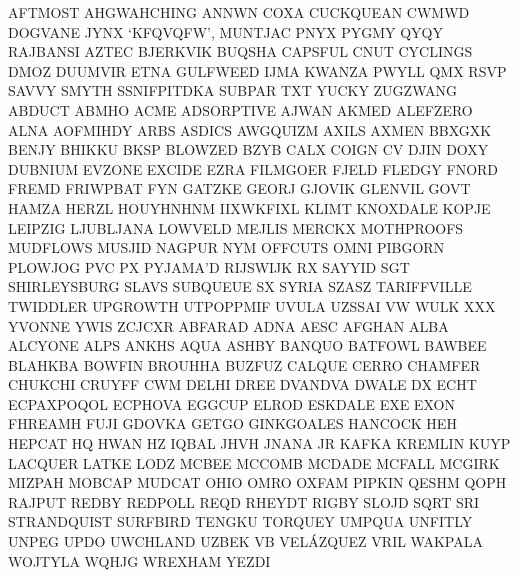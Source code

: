 \documentclass[a4paper,14pt]{memoir}
\begin{document}
{AFTMOST AHGWAHCHING ANNWN COXA CUCKQUEAN CWMWD DOGVANE JYNX ‘KFQVQFW’, MUNTJAC PNYX PYGMY QYQY RAJBANSI AZTEC BJERKVIK BUQSHA CAPSFUL CNUT CYCLINGS DMOZ DUUMVIR ETNA GULFWEED IJMA KWANZA PWYLL QMX RSVP SAVVY SMYTH SSNIFPITDKA SUBPAR TXT YUCKY ZUGZWANG ABDUCT ABMHO ACME ADSORPTIVE AJWAN AKMED ALEFZERO ALNA AOFMIHDY ARBS ASDICS AWGQUIZM AXILS AXMEN BBXGXK BENJY BHIKKU BKSP BLOWZED BZYB CALX COIGN CV DJIN DOXY DUBNIUM EVZONE EXCIDE EZRA FILMGOER FJELD FLEDGY FNORD FREMD FRIWPBAT FYN GATZKE GEORJ GJOVIK GLENVIL GOVT HAMZA HERZL HOUYHNHNM IIXWKFIXL KLIMT KNOXDALE KOPJE LEIPZIG LJUBLJANA LOWVELD MEJLIS MERCKX MOTHPROOFS MUDFLOWS MUSJID NAGPUR NYM OFFCUTS OMNI PIBGORN PLOWJOG PVC PX PYJAMA’D RIJSWIJK RX SAYYID SGT SHIRLEYSBURG SLAVS SUBQUEUE SX SYRIA SZASZ TARIFFVILLE TWIDDLER UPGROWTH UTPOPPMIF UVULA UZSSAI VW WULK XXX YVONNE YWIS ZCJCXR ABFARAD ADNA AESC AFGHAN ALBA ALCYONE ALPS ANKHS AQUA ASHBY BANQUO BATFOWL BAWBEE BLAHKBA BOWFIN BROUHHA BUZFUZ CALQUE CERRO CHAMFER CHUKCHI CRUYFF CWM DELHI DREE DVANDVA DWALE DX ECHT ECPAXPOQOL ECPHOVA EGGCUP ELROD ESKDALE EXE EXON FHREAMH FUJI GDOVKA GETGO GINKGOALES HANCOCK HEH HEPCAT HQ HWAN HZ IQBAL JHVH JNANA JR KAFKA KREMLIN KUYP LACQUER LATKE LODZ MCBEE MCCOMB MCDADE MCFALL MCGIRK MIZPAH MOBCAP MUDCAT OHIO OMRO OXFAM PIPKIN QESHM QOPH RAJPUT REDBY REDPOLL REQD RHEYDT RIGBY SLOJD SQRT SRI STRANDQUIST SURFBIRD TENGKU TORQUEY UMPQUA UNFITLY UNPEG UPDO UWCHLAND UZBEK VB VELÁZQUEZ VRIL WAKPALA WOJTYLA WQHJG WREXHAM YEZDI

}
\end{document}
